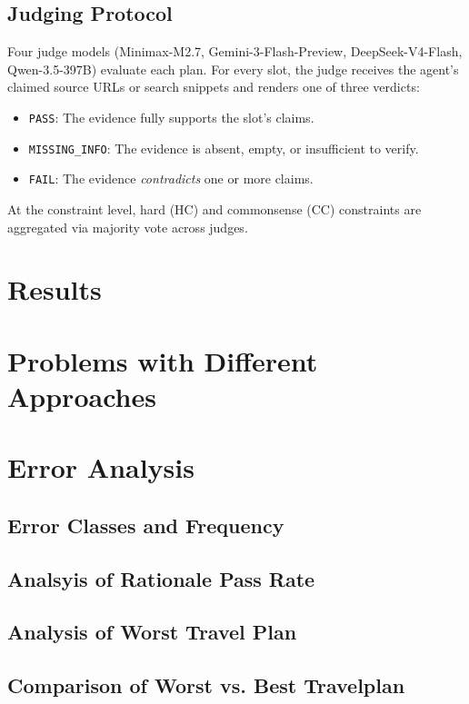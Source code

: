 \documentclass[a4paper,oneside,bibliography=totoc]{scrbook}
\begin{document}
\subsection{Judging Protocol}

Four judge models (Minimax-M2.7, Gemini-3-Flash-Preview, DeepSeek-V4-Flash, Qwen-3.5-397B) evaluate each plan. For every slot, the judge receives the agent's claimed source URLs or search snippets and renders one of three verdicts:
\begin{itemize}
    \item \texttt{PASS}: The evidence fully supports the slot's claims.
    \item \texttt{MISSING\_INFO}: The evidence is absent, empty, or insufficient to verify.
    \item \texttt{FAIL}: The evidence \emph{contradicts} one or more claims.
\end{itemize}
At the constraint level, hard (HC) and commonsense (CC) constraints are aggregated via majority vote across judges.

\section{Results}
\section{Problems with Different Approaches}

\section{Error Analysis}
\subsection{Error Classes and Frequency}


\subsection{Analsyis of Rationale Pass Rate}
\subsection{Analysis of Worst Travel Plan}
\subsection{Comparison of Worst vs. Best Travelplan}
\end{document}
